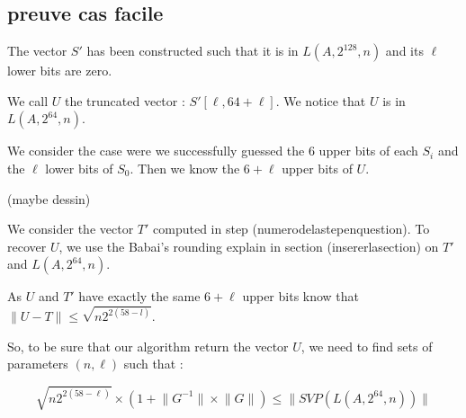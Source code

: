 \documentclass[preprint]{iacrtrans}
\begin{document}
\subsection{preuve cas facile}

The vector \(S'\) has been constructed such that it is in \(L(A,2^{128},n)\) and its \(\ell\) lower bits are zero.

We call \(U\) the truncated vector : \(S'[\ell,64+\ell]\). We notice that \(U\) is in \(L(A,2^{64},n)\).

We consider the case were we successfully guessed the 6 upper bits of each \(S_i\) and the \(\ell\) lower bits of \(S_0\). Then we know the \(6+\ell\) upper bits of \(U\).

(maybe dessin)


We consider the vector \(T'\) computed in step (numerodelastepenquestion). To recover \(U\), we use the Babai's rounding explain in section (insererlasection) on \(T'\) and \(L(A,2^{64},n)\).

As \(U\) and \(T'\) have exactly the same \(6+\ell\) upper bits  know that \(\lVert U-T \rVert \leqslant \sqrt{n2^{2(58-l)}}\).

So, to be sure that our algorithm return the vector \(U\), we need to find sets of parameters \((n,\ell)\) such that :	 

\[\sqrt{n2^{2(58-\ell)}} \times (1 +\lVert G^{-1} \rVert  \times \lVert G\rVert) \leqslant \lVert SVP(L(A,2^{64},n))\rVert \]
\end{document}
